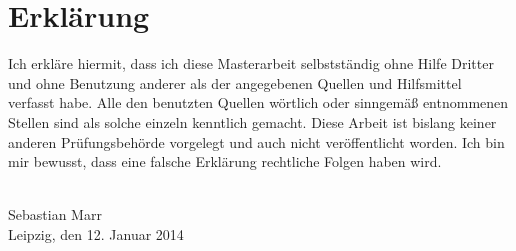 \chapter*{Erklärung}

Ich erkläre hiermit, dass ich diese Masterarbeit selbstständig ohne Hilfe Dritter und ohne Benutzung anderer als der angegebenen Quellen und Hilfsmittel verfasst habe. Alle den benutzten Quellen wörtlich oder sinngemäß entnommenen Stellen sind als solche einzeln kenntlich gemacht. Diese Arbeit ist bislang keiner anderen Prüfungsbehörde vorgelegt und auch nicht veröffentlicht worden. Ich bin mir bewusst, dass eine falsche Erklärung rechtliche Folgen haben wird. 

{
\vspace{32pt}
\noindent
\hdashrule{5cm}{1pt}{1pt 3pt}\\
Sebastian Marr\\
Leipzig, den 12. Januar 2014
}
